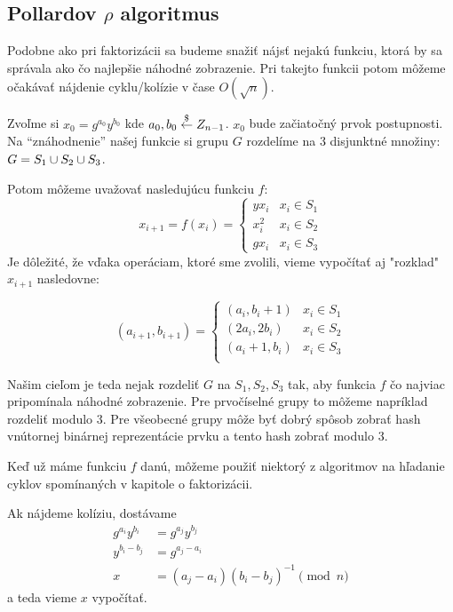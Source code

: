 \subsection{Pollardov $\rho$ algoritmus}
Podobne ako pri faktorizácii sa budeme snažiť nájsť nejakú funkciu, ktorá
by sa správala ako čo najlepšie náhodné zobrazenie. Pri takejto funkcii
potom môžeme očakávať nájdenie cyklu/kolízie v čase $O(\sqrt{n})$.

Zvoľme si $x_0 = g^{a_0} y^{b_0}$ kde $a_0,b_0 \overset{\$}{\leftarrow} Z_{n-1}$.
$x_0$ bude začiatočný prvok postupnosti. Na ``znáhodnenie'' našej funkcie
si grupu $G$ rozdelíme na 3 disjunktné množiny:
$G=S_1 \cup S_2 \cup  S_3$.

Potom môžeme uvažovať nasledujúcu funkciu $f$:
\begin{equation*}
    x_{i+1} = f(x_i) =
        \begin{cases}
         y x_i & x_i \in S_1 \\
         x_i^2 & x_i \in S_2 \\
         g x_i & x_i \in S_3
        \end{cases}
\end{equation*}
Je dôležité, že vďaka operáciam, ktoré sme zvolili, vieme vypočítať aj
"rozklad" $x_{i+1}$ nasledovne:

\begin{equation*}
    (a_{i+1},b_{i+1}) =
        \begin{cases}
         (a_i,b_i+1) & x_i \in S_1 \\
         (2a_i,2b_i) & x_i \in S_2 \\
         (a_i+1,b_i) & x_i \in S_3 \\
        \end{cases}
\end{equation*}

Našim cieľom je teda nejak rozdeliť $G$ na $S_1,S_2,S_3$ tak, aby
funkcia $f$ čo najviac pripomínala náhodné zobrazenie.
Pre prvočíselné grupy to môžeme napríklad rozdeliť modulo 3.
Pre všeobecné grupy môže byť dobrý spôsob zobrať hash vnútornej binárnej
reprezentácie prvku a tento hash zobrať modulo 3.

Keď už máme funkciu $f$ danú, môžeme použiť niektorý z algoritmov na
hľadanie cyklov spomínaných v kapitole o faktorizácii.

Ak nájdeme kolíziu, dostávame
\begin{align*}
    g^{a_i} y^{b_i} &= g^{a_j} y^{b_j} \\
    y^{b_i-b_j} &= g^{a_j-a_i} \\
    x &=(a_j - a_i)(b_i-b_j)^{-1} \pmod n
\end{align*}
a teda vieme $x$ vypočítať.

